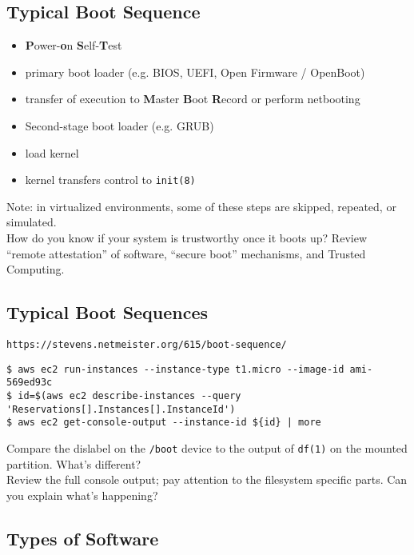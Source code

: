 \documentclass[xga]{xdvislides}
\begin{document}
\subsection{Typical Boot Sequence}
\begin{itemize}
	\item {\bf P}ower-{\bf o}n {\bf S}elf-{\bf T}est
	\item primary boot loader (e.g. BIOS, UEFI, Open Firmware / OpenBoot)
	\item transfer of execution to {\bf M}aster {\bf B}oot {\bf R}ecord or perform netbooting
	\item Second-stage boot loader (e.g. GRUB)
	\item load kernel
	\item kernel transfers control to {\tt init(8)}
\end{itemize}
\vspace{.5in}
Note: in virtualized environments, some of these steps
are skipped, repeated, or simulated. \\

\vspace{.25in}
How do you know if your system is trustworthy once it
boots up? Review ``remote attestation'' of software,
``secure boot'' mechanisms, and Trusted Computing.

\subsection{Typical Boot Sequences}
\verb+https://stevens.netmeister.org/615/boot-sequence/+
\vspace*{\fill}
\begin{verbatim}
$ aws ec2 run-instances --instance-type t1.micro --image-id ami-569ed93c
$ id=$(aws ec2 describe-instances --query 'Reservations[].Instances[].InstanceId')
$ aws ec2 get-console-output --instance-id ${id} | more
\end{verbatim}
\vspace{.5in}
Compare the dislabel on the {\tt /boot} device to the
output of {\tt df(1)} on the mounted partition.
What's different? \\

Review the full console output; pay attention to the
filesystem specific parts.  Can you explain what's
happening?
\vspace*{\fill}

\subsection{Types of Software}
\end{document}
